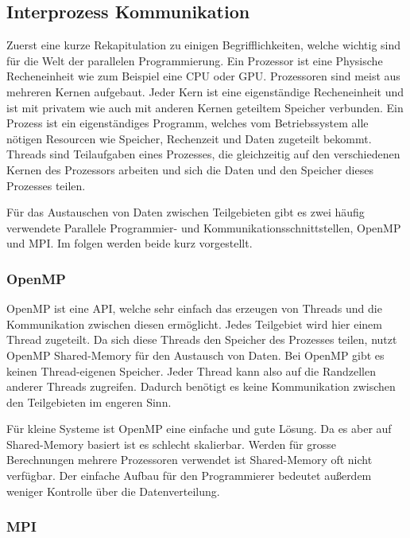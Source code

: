 %
%
%
%
\subsection{Interprozess Kommunikation \label{parallelisierung:sub:Interprozess}}
Zuerst eine kurze Rekapitulation zu einigen Begrifflichkeiten, welche wichtig sind für die Welt der parallelen Programmierung.
Ein Prozessor ist eine Physische Recheneinheit wie zum Beispiel eine CPU oder GPU.
Prozessoren sind meist aus mehreren Kernen aufgebaut.
Jeder Kern ist eine eigenständige Recheneinheit und ist mit privatem wie auch mit anderen Kernen geteiltem Speicher verbunden.
Ein Prozess ist ein eigenständiges Programm, welches vom Betriebssystem alle nötigen Resourcen wie Speicher, Rechenzeit und Daten zugeteilt bekommt.
Threads sind Teilaufgaben eines Prozesses, die gleichzeitig auf den verschiedenen Kernen des Prozessors arbeiten und sich die Daten und den Speicher dieses Prozesses teilen.

Für das Austauschen von Daten zwischen Teilgebieten gibt es zwei häufig verwendete Parallele Programmier- und Kommunikationsschnittstellen, OpenMP und MPI.
Im folgen werden beide kurz vorgestellt.

\subsubsection{OpenMP}
OpenMP ist eine API, welche sehr einfach das erzeugen von Threads und die Kommunikation zwischen diesen ermöglicht.
Jedes Teilgebiet wird hier einem Thread zugeteilt. 
Da sich diese Threads den Speicher des Prozesses teilen, nutzt OpenMP Shared-Memory für den Austausch von Daten.
Bei OpenMP gibt es keinen Thread-eigenen Speicher.
Jeder Thread kann also auf die Randzellen anderer Threads zugreifen.
Dadurch benötigt es keine Kommunikation zwischen den Teilgebieten im engeren Sinn.

Für kleine Systeme ist OpenMP eine einfache und gute Lösung.
Da es aber auf Shared-Memory basiert ist es schlecht skalierbar.
Werden für grosse Berechnungen mehrere Prozessoren verwendet ist Shared-Memory oft nicht verfügbar.
Der einfache Aufbau für den Programmierer bedeutet außerdem weniger Kontrolle über die Datenverteilung.

\subsubsection{MPI}
